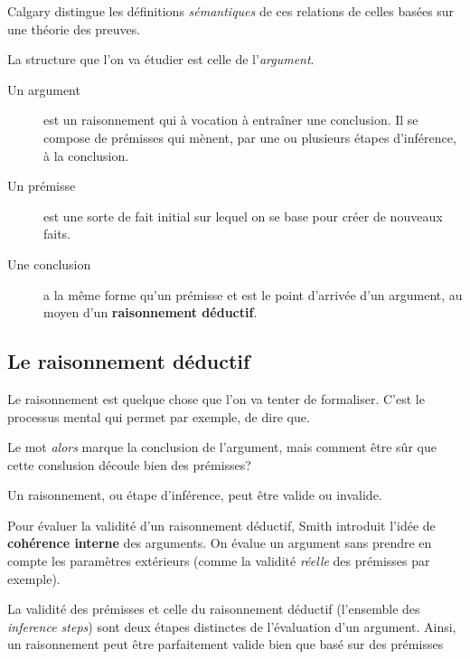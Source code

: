 \documentclass[fleqn,a4paper,nobib]{tufte-handout}
\begin{document}
Calgary distingue les définitions \emph{sémantiques} de ces
relations de celles basées sur une théorie des preuves.

La structure que l'on va étudier est celle de l'\textit{argument}.

\begin{description}
    \item[Un argument] est un raisonnement qui à vocation à entraîner une conclusion.
    Il se compose de prémisses qui mènent, par une ou plusieurs étapes d'inférence, à
    la conclusion.
    \item[Un prémisse] est une sorte de fait initial sur lequel on se base pour
    créer de nouveaux faits.
    \item[Une conclusion] a la même forme qu'un prémisse et est le point d'arrivée
    d'un argument, au moyen d'un \textbf{raisonnement déductif}.
\end{description}

\subsection{Le raisonnement déductif}

Le raisonnement est quelque chose que l'on va tenter de formaliser. C'est
le processus mental qui permet par exemple, de dire que.

Le mot \textit{alors} marque la conclusion de l'argument, mais comment être sûr
que cette conslusion découle bien des prémisses?

Un raisonnement, ou étape d'inférence, peut être valide ou invalide.

Pour évaluer la validité d'un raisonnement déductif, Smith introduit l'idée de
\textbf{cohérence interne} des arguments. On évalue un argument sans prendre
en compte les paramètres extérieurs (comme la validité \emph{réelle} des prémisses
par exemple).

La validité des prémisses et celle du raisonnement déductif (l'ensemble
des \textit{inference steps})
sont deux étapes distinctes de l'évaluation d'un argument. Ainsi,
un raisonnement peut être parfaitement valide bien que basé sur des prémisses
\end{document}
